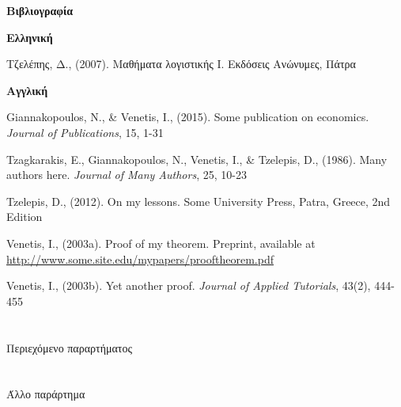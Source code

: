 \documentclass[12pt,a4paper,oneside]{book}
\newcommand{\la}{\latintext}
\begin{document}
{\LARGE \textbf{Βιβλιογραφία}}

\bigskip
{\large \textbf{Ελληνική}}
\begin{list}{ }{\itemsep3pt}
	\item Τζελέπης, Δ., (2007). Μαθήματα λογιστικής {\la I}. Εκδόσεις Ανώνυμες, Πάτρα
\end{list}

\bigskip
{\large \textbf{Αγγλική}}
\begin{list}{ }{\itemsep3pt}
	\item {\la Giannakopoulos, N., \& Venetis, I., (2015). Some publication on economics. \emph{Journal of Publications}, 15, 1-31}
	\item {\la Tzagkarakis, E., Giannakopoulos, N., Venetis, I., \& Tzelepis, D., (1986). Many authors here. \emph{Journal of Many Authors}, 25, 10-23}
	\item {\la Tzelepis, D., (2012). On my lessons. Some University Press, Patra, Greece, 2nd Edition}
	\item {\la Venetis, I., (2003a). Proof of my theorem. Preprint, available at \url{http://www.some.site.edu/mypapers/prooftheorem.pdf}}
	\item {\la Venetis, I., (2003b). Yet another proof. \emph{Journal of Applied Tutorials}, 43(2), 444-455}
\end{list}







\newpage
\appendix



\chapter{}
Περιεχόμενο παραρτήματος


\chapter{}
Άλλο παράρτημα 
\end{document}

